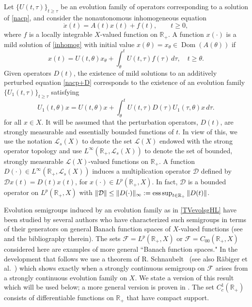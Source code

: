 \documentclass[10pt,psamsfonts,leqno]{siamltex}
\newcommand{\bbR}{\mathbb{R}}
\newcommand{\Dom}{\operatorname{Dom}}
\newcommand{\esssup}{\operatornamewithlimits{ess\, sup}}
\renewcommand{\t}{\tau}
\newcommand{\lb}{\label}
\newcommand{\Coo}{{C_{00}(\bbR_+,X)}}
\newcommand{\LpRp}{{L^p(\bbR_+,X)}}
\newcommand{\LpRX}{{L^p(\bbR_+,X)}}
\begin{document}
Let $\{U(t,\tau)\}_{t\ge\tau}$ be an
evolution family of operators corresponding to a solution  of
\eqref{nacp}, and consider the nonautonomous inhomogeneous equation
\begin{equation}\lb{inhomog}
\dot x(t)=A(t)x(t)+f(t),\qquad t\ge0,
\end{equation}
where $f$ is a locally integrable $X$-valued function on $\bbR_+$.
A function $x(\cdot)$ is a mild solution of \eqref{inhomog}
with initial value $x(\theta)=x_\theta \in \Dom(A(\theta))$ if
\[
x(t)=U(t,\theta)x_\theta+\int_\theta^tU(t,\tau)f(\tau)\,d\tau,
\quad t\ge \theta.
\]
Given operators $D(t)$, the existence of mild
solutions to an additively perturbed equation \eqref{nacp+D}
corresponds to the existence of an evolution
family  $\{U_1(t,\tau)\}_{t\ge \tau}$ satisfying
\begin{equation}\lb{varpar}
U_1(t,\theta)x=U(t,\theta)x+\int_\theta^tU(t,\t)D(\t)U_1(\t,\theta)x\,d\t.
\end{equation}
for all $x\in X$.
It will be assumed that the perturbation operators, $D(t)$,  are
strongly measurable and essentially bounded functions of
$t$.  In view of this, we use the notation  $\mathcal{L}_s(X)$
to denote the set $\mathcal{L}(X)$  endowed with the
strong operator topology and  use
$L^\infty(\bbR_+,\mathcal{L}_s(X))$ to denote the set of
 bounded, strongly measurable
$\mathcal{L}(X)$-valued functions on $\bbR_+$.
A function $D(\cdot)\in L^\infty(\bbR_+,\mathcal{L}_s(X))$
induces a  multiplication operator $\mathcal{D}$ defined
by $\mathcal{D} x(t)=D(t)x(t)$, for $x(\cdot)\in L^p(\bbR_+,X)$.
In fact,  $\mathcal{D}$ is a bounded operator
on $\LpRX$  with $\|\mathcal{D}\| \le
\|D(\cdot)\|_\infty:=\esssup_{t\in\Bbb{R}_+}\|D(t)\|$.

Evolution semigroups induced by an evolution family as in
\eqref{TVevolsgHL} have been studied by several authors
who have characterized such semigroups in
terms of their generators on general Banach function spaces  of
$X$-valued functions (see \cite{RRSV,RolandDis}
and the bibliography therein).  The sets  $\mathcal{F}=\LpRp$ or
$\mathcal{F}=\Coo$  considered here are examples of more general
``Banach
function spaces."   In the development that follows we use
a theorem of  R. Schnaubelt~\cite{RolandDis} (see also R\"abiger et
al.~\cite{RRS, RRSV}) which shows exactly when a strongly continuous
semigroup on $\mathcal{F}$ arises  from a strongly continuous evolution
family on
$X$.  We state a version of this result which will be used below; a
more general version is proven in
\cite{RRSV}.  The set $C_c^1(\bbR_+)$ consists of differentiable
functions on $\bbR_+$ that have compact support.
\end{document}
